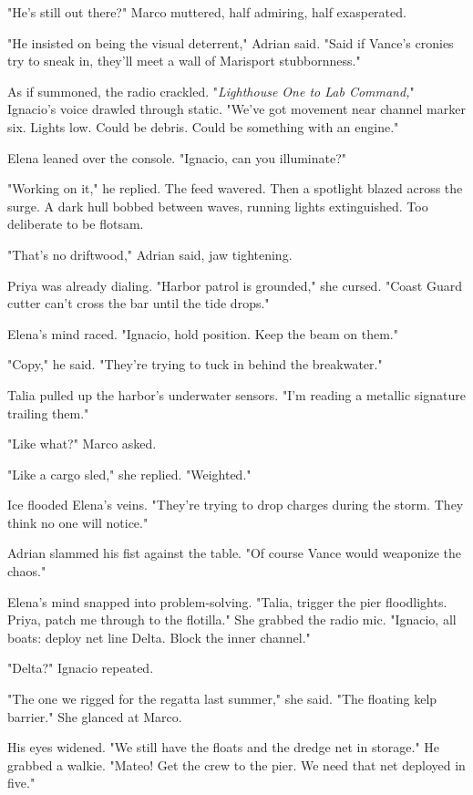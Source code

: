 "He's still out there?" Marco muttered, half admiring, half exasperated.

"He insisted on being the visual deterrent," Adrian said. "Said if Vance's cronies try to sneak in, they'll meet a wall of Marisport stubbornness."

As if summoned, the radio crackled. "\textit{Lighthouse One to Lab Command,}" Ignacio's voice drawled through static. "We've got movement near channel marker six. Lights low. Could be debris. Could be something with an engine."

Elena leaned over the console. "Ignacio, can you illuminate?"

"Working on it," he replied. The feed wavered. Then a spotlight blazed across the surge. A dark hull bobbed between waves, running lights extinguished. Too deliberate to be flotsam.

"That's no driftwood," Adrian said, jaw tightening.

Priya was already dialing. "Harbor patrol is grounded," she cursed. "Coast Guard cutter can't cross the bar until the tide drops."

Elena's mind raced. "Ignacio, hold position. Keep the beam on them."

"Copy," he said. "They're trying to tuck in behind the breakwater."

Talia pulled up the harbor's underwater sensors. "I'm reading a metallic signature trailing them."

"Like what?" Marco asked.

"Like a cargo sled," she replied. "Weighted."

Ice flooded Elena's veins. "They're trying to drop charges during the storm. They think no one will notice."

Adrian slammed his fist against the table. "Of course Vance would weaponize the chaos."

Elena's mind snapped into problem-solving. "Talia, trigger the pier floodlights. Priya, patch me through to the flotilla." She grabbed the radio mic. "Ignacio, all boats: deploy net line Delta. Block the inner channel."

"Delta?" Ignacio repeated.

"The one we rigged for the regatta last summer," she said. "The floating kelp barrier." She glanced at Marco.

His eyes widened. "We still have the floats and the dredge net in storage." He grabbed a walkie. "Mateo! Get the crew to the pier. We need that net deployed in five."


